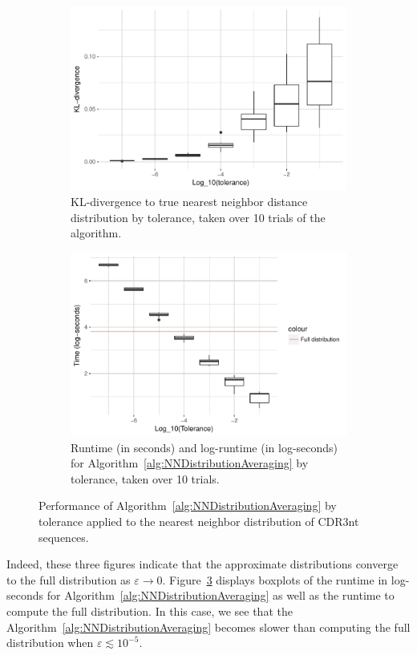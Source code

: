 \documentclass{article}
\begin{document}
\begin{figure}
\begin{subfigure}{.49\textwidth}
        \includegraphics[width=\linewidth]{Figures/NearestNeighbor/CDR3/div_by_tol.pdf}
    	\caption{KL-divergence to true nearest neighbor distance distribution by tolerance, taken over 10 trials of the algorithm.}
    	\label{fig:NNDivergences}
	\end{subfigure}
    \begin{subfigure}{.49\textwidth}
    	\includegraphics[width=0.9\linewidth]{Figures/NearestNeighbor/CDR3/log_time_by_tol.pdf}
    	\caption{Runtime (in seconds) and log-runtime (in log-seconds) for Algorithm~\ref{alg:NNDistributionAveraging} by tolerance, taken over 10 trials.}
    	\label{fig:NNTimes}
    \end{subfigure}
    \caption{Performance of Algorithm~\ref{alg:NNDistributionAveraging} by tolerance applied to the nearest neighbor distribution of CDR3nt sequences.}
\end{figure}
Indeed, these three figures indicate that the approximate distributions converge to the full distribution as $\varepsilon \to 0$.
Figure~\ref{fig:NNTimes} displays boxplots of the runtime in log-seconds for Algorithm~\ref{alg:NNDistributionAveraging} as well as the runtime to compute the full distribution.
In this case, we see that the Algorithm~\ref{alg:NNDistributionAveraging} becomes slower than computing the full distribution when $\varepsilon \lesssim 10^{-5}$.
\end{document}

